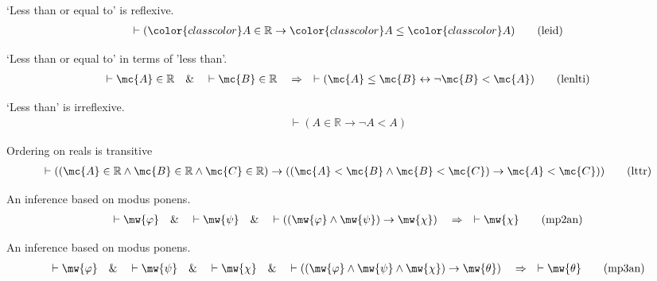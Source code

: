 \begin{lemma} {`Less than or equal to' is reflexive.} 
\begin{align}
\vdash ( {\color{classcolor}A} \in \mathbb{R} \rightarrow {\color{classcolor}A}
    \le {\color{classcolor}A} )\label{eq:leid}\tag{leid}
\end{align}
\end{lemma}


\begin{lemma} {`Less than or equal to' in terms of 'less
than'.}  
\begin{align}
\vdash \mc{A} \in \mathbb{R}\quad\&\quad \vdash \mc{B} \in
    \mathbb{R}\quad\Rightarrow\quad \vdash ( \mc{A} \le \mc{B} \leftrightarrow
    \lnot \mc{B} < \mc{A} )\label{eq:lenlti}\tag{lenlti}
\end{align}
\end{lemma}


\begin{lemma} {`Less than' is irreflexive.}  
\begin{align}
\vdash ( A \in \mathbb{R} \rightarrow \lnot A < A )\label{eq:ltnr}\tag{ltnr}
\end{align}
\end{lemma}


\begin{lemma} {Ordering on reals is transitive}
\begin{align}
\vdash ( ( \mc{A} \in \mathbb{R} \wedge \mc{B} \in \mathbb{R} \wedge \mc{C} \in \mathbb{R} )
    \rightarrow ( ( \mc{A} < \mc{B} \wedge \mc{B} < \mc{C} ) \rightarrow \mc{A} < \mc{C} )
    )\label{eq:lttr}\tag{lttr}
\end{align}
\end{lemma}


\begin{lemma} {An inference based on modus ponens.} 
\begin{align}
\vdash \mw{\varphi}\quad\&\quad \vdash \mw{\psi}\quad\&\quad \vdash ( (
    \mw{\varphi} \wedge \mw{\psi} ) \rightarrow \mw{\chi}
    )\quad\Rightarrow\quad \vdash \mw{\chi}\label{eq:mp2an}\tag{mp2an}
\end{align}
\end{lemma}


\begin{lemma} {An inference based on modus ponens.} 
\begin{align}
\vdash \mw{\varphi}\quad\&\quad \vdash \mw{\psi}\quad\&\quad \vdash
    \mw{\chi}\quad\&\quad \vdash ( ( \mw{\varphi} \wedge \mw{\psi} \wedge
    \mw{\chi} ) \rightarrow \mw{\theta} )\quad\Rightarrow\quad \vdash
    \mw{\theta}\label{eq:mp3an}\tag{mp3an}
\end{align}
\end{lemma}


